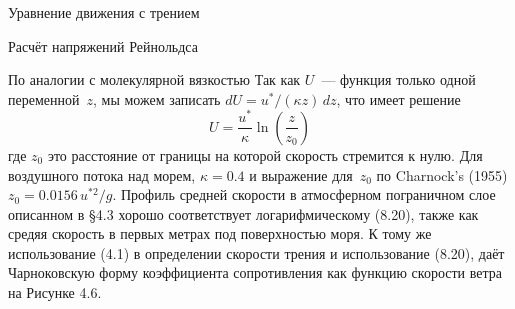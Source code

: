 \begin{chapter}{Уравнение движения с трением}
\begin{section}{Расчёт напряжений Рейнольдса}
\begin{paragraph}{По аналогии с молекулярной вязкостью}
Так как $U$~--- функция только одной переменной~$z$, мы можем 
записать $dU = u^*/(\kappa z) \, dz$, что имеет решение
\begin{equation}
U = \frac{u^*}{\kappa} \ln \left(\frac{z}{z_0}\right)
\end{equation}
где $z_0$ это расстояние от границы на которой скорость стремится к
нулю. Для воздушного потока над морем, $\kappa = 0.4$ и выражение для~$z_0$ по
Charnock's (1955) $z_0 = 0.0156 \, u^{*2}/g$. Профиль средней скорости в
атмосферном пограничном слое описанном в \S4.3 хорошо соответствует
логарифмическому (8.20), также как средяя скорость в первых метрах под
поверхностью моря. К тому же использование (4.1) в определении
скорости трения и использование (8.20), даёт Чарноковскую форму
коэффициента сопротивления как функцию скорости ветра на Рисунке 4.6.
%
%


\end{paragraph}
\end{section}
\end{chapter}
